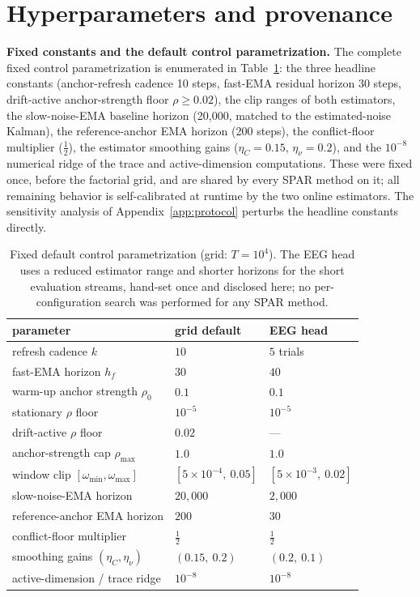 \section{Hyperparameters and provenance}
\label{app:hyper}
\setcounter{figure}{0}\setcounter{table}{0}

\textbf{Fixed constants and the default control parametrization.}
The complete fixed control parametrization is enumerated in Table~\ref{tab:hyper}: the three headline constants (anchor-refresh cadence 10 steps, fast-EMA residual horizon 30 steps, drift-active anchor-strength floor $\rho \ge 0.02$), the clip ranges of both estimators, the slow-noise-EMA baseline horizon (20{,}000, matched to the estimated-noise Kalman), the reference-anchor EMA horizon (200 steps), the conflict-floor multiplier ($\tfrac12$), the estimator smoothing gains ($\eta_C = 0.15$, $\eta_\nu = 0.2$), and the $10^{-8}$ numerical ridge of the trace and active-dimension computations.
These were fixed once, before the factorial grid, and are shared by every SPAR method on it; all remaining behavior is self-calibrated at runtime by the two online estimators.
The sensitivity analysis of Appendix~\ref{app:protocol} perturbs the headline constants directly.

\begin{table}[htbp]
\centering
\small
\caption{Fixed default control parametrization (grid: $T = 10^4$). The EEG head uses a reduced estimator range and shorter horizons for the short evaluation streams, hand-set once and disclosed here; no per-configuration search was performed for any SPAR method.}
\label{tab:hyper}
\begin{tabular}{lll}
\toprule
parameter & grid default & EEG head \\
\midrule
refresh cadence $k$ & $10$ & $5$ trials \\
fast-EMA horizon $h_f$ & $30$ & $40$ \\
warm-up anchor strength $\rho_0$ & $0.1$ & $0.1$ \\
stationary $\rho$ floor & $10^{-5}$ & $10^{-5}$ \\
drift-active $\rho$ floor & $0.02$ & --- \\
anchor-strength cap $\rho_{\max}$ & $1.0$ & $1.0$ \\
window clip $[\omega_{\min}, \omega_{\max}]$ & $[5\times10^{-4},\ 0.05]$ & $[5\times10^{-3},\ 0.02]$ \\
slow-noise-EMA horizon & $20{,}000$ & $2{,}000$ \\
reference-anchor EMA horizon & $200$ & $30$ \\
conflict-floor multiplier & $\tfrac12$ & $\tfrac12$ \\
smoothing gains $(\eta_C, \eta_\nu)$ & $(0.15,\ 0.2)$ & $(0.2,\ 0.1)$ \\
active-dimension / trace ridge & $10^{-8}$ & $10^{-8}$ \\
\bottomrule
\end{tabular}
\end{table}

